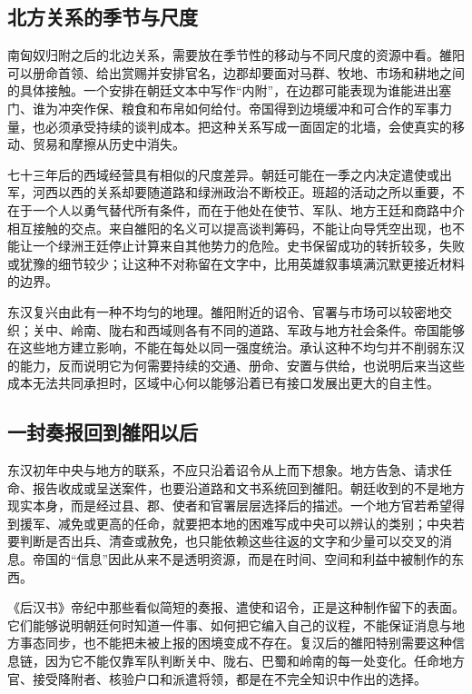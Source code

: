 \subsection{北方关系的季节与尺度}

南匈奴归附之后的北边关系，需要放在季节性的移动与不同尺度的资源中看。雒阳可以册命首领、给出赏赐并安排官名，边郡却要面对马群、牧地、市场和耕地之间的具体接触。一个安排在朝廷文本中写作“内附”，在边郡可能表现为谁能进出塞门、谁为冲突作保、粮食和布帛如何给付。帝国得到边境缓冲和可合作的军事力量，也必须承受持续的谈判成本。把这种关系写成一面固定的北墙，会使真实的移动、贸易和摩擦从历史中消失。

七十三年后的西域经营具有相似的尺度差异。朝廷可能在一季之内决定遣使或出军，河西以西的关系却要随道路和绿洲政治不断校正。班超的活动之所以重要，不在于一个人以勇气替代所有条件，而在于他处在使节、军队、地方王廷和商路中介相互接触的交点。来自雒阳的名义可以提高谈判筹码，不能让向导凭空出现，也不能让一个绿洲王廷停止计算来自其他势力的危险。史书保留成功的转折较多，失败或犹豫的细节较少；让这种不对称留在文字中，比用英雄叙事填满沉默更接近材料的边界。

东汉复兴由此有一种不均匀的地理。雒阳附近的诏令、官署与市场可以较密地交织；关中、岭南、陇右和西域则各有不同的道路、军政与地方社会条件。帝国能够在这些地方建立影响，不能在每处以同一强度统治。承认这种不均匀并不削弱东汉的能力，反而说明它为何需要持续的交通、册命、安置与供给，也说明后来当这些成本无法共同承担时，区域中心何以能够沿着已有接口发展出更大的自主性。

\subsection{一封奏报回到雒阳以后}

东汉初年中央与地方的联系，不应只沿着诏令从上而下想象。地方告急、请求任命、报告收成或呈送案件，也要沿道路和文书系统回到雒阳。朝廷收到的不是地方现实本身，而是经过县、郡、使者和官署层层选择后的描述。一个地方官若希望得到援军、减免或更高的任命，就要把本地的困难写成中央可以辨认的类别；中央若要判断是否出兵、清查或赦免，也只能依赖这些往返的文字和少量可以交叉的消息。帝国的“信息”因此从来不是透明资源，而是在时间、空间和利益中被制作的东西。

《后汉书》帝纪中那些看似简短的奏报、遣使和诏令，正是这种制作留下的表面。它们能够说明朝廷何时知道一件事、如何把它编入自己的议程，不能保证消息与地方事态同步，也不能把未被上报的困境变成不存在。复汉后的雒阳特别需要这种信息链，因为它不能仅靠军队判断关中、陇右、巴蜀和岭南的每一处变化。任命地方官、接受降附者、核验户口和派遣将领，都是在不完全知识中作出的选择。

